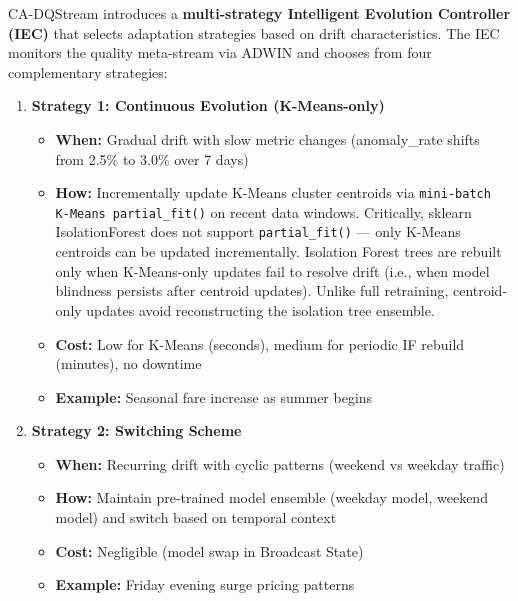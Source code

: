 CA-DQStream introduces a \textbf{multi-strategy Intelligent Evolution Controller (IEC)} that selects adaptation strategies based on drift characteristics. The IEC monitors the quality meta-stream via ADWIN and chooses from four complementary strategies:

\begin{enumerate}
    \item \textbf{Strategy 1: Continuous Evolution (K-Means-only)}
        \begin{itemize}
            \item \textbf{When:} Gradual drift with slow metric changes (anomaly\_rate shifts from 2.5\% to 3.0\% over 7 days)
            \item \textbf{How:} Incrementally update K-Means cluster centroids via \texttt{mini-batch K-Means partial\_fit()} on recent data windows. Critically, sklearn IsolationForest does not support \texttt{partial\_fit()} --- only K-Means centroids can be updated incrementally. Isolation Forest trees are rebuilt only when K-Means-only updates fail to resolve drift (i.e., when model blindness persists after centroid updates). Unlike full retraining, centroid-only updates avoid reconstructing the isolation tree ensemble.
            \item \textbf{Cost:} Low for K-Means (seconds), medium for periodic IF rebuild (minutes), no downtime
            \item \textbf{Example:} Seasonal fare increase as summer begins
        \end{itemize}

    \item \textbf{Strategy 2: Switching Scheme}
        \begin{itemize}
            \item \textbf{When:} Recurring drift with cyclic patterns (weekend vs weekday traffic)
            \item \textbf{How:} Maintain pre-trained model ensemble (weekday model, weekend model) and switch based on temporal context
            \item \textbf{Cost:} Negligible (model swap in Broadcast State)
            \item \textbf{Example:} Friday evening surge pricing patterns
        \end{itemize}


\end{enumerate}
